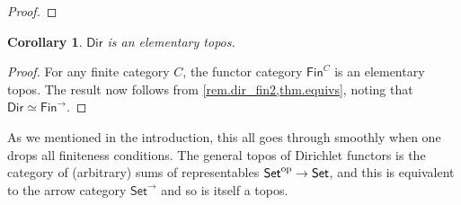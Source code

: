 \documentclass[11pt, article, one side]{memoir}
\theoremstyle{theorem}
\newtheorem{corollary}[section]{Corollary}
\theoremstyle{definition}
\theoremstyle{remark}
\newcommand{\Cat}[1]{\mathsf{#1}}%
\newcommand{\op}{^\tn{op}}
\newcommand{\tn}[1]{\textnormal{#1}}
\newcommand{\smset}{\Cat{Set}}
\newcommand{\fin}{\Cat{Fin}}
\newcommand{\bun}{\Cat{Bun}}
\newcommand{\dir}{\Cat{Dir}}
\begin{document}
\begin{proof}
\end{proof}

\begin{corollary}\label{cor.dir_topos}
$\dir$ is an elementary topos.
\end{corollary}
\begin{proof}
For any finite category $C$, the functor category $\fin^C$ is an elementary topos. The result now follows from \cref{rem.dir_fin2,thm.equivs}, noting that $\dir \simeq \fin^{\to}$.
\end{proof}

As we mentioned in the introduction, this all goes through smoothly when one drops all finiteness conditions. The general topos of Dirichlet functors is the category of (arbitrary) sums of representables $\smset\op \to \smset$, and this is equivalent to the arrow category $\smset^{\to}$ and so is itself a topos.
\end{document}
